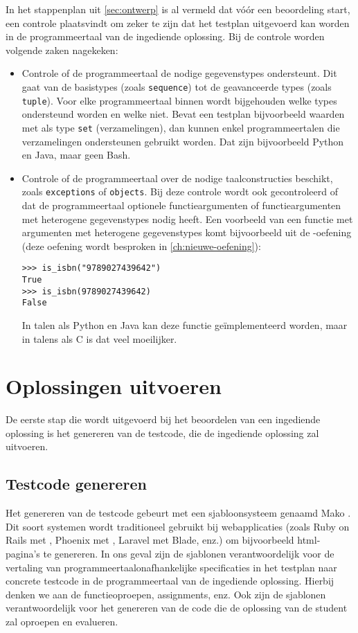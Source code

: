 In het stappenplan uit \cref{sec:ontwerp} is al vermeld dat vóór een beoordeling start, een controle plaatsvindt om zeker te zijn dat het testplan uitgevoerd kan worden in de programmeertaal van de ingediende oplossing.
Bij de controle worden volgende zaken nagekeken:
\begin{itemize}
    \item Controle of de programmeertaal de nodige gegevenstypes ondersteunt.
    Dit gaat van de basistypes (zoals \texttt{sequence}) tot de geavanceerde types (zoals \texttt{tuple}).
    Voor elke programmeertaal binnen \tested{} wordt bijgehouden welke types ondersteund worden en welke niet.
    Bevat een testplan bijvoorbeeld waarden met als type \texttt{set} (verzamelingen), dan kunnen enkel programmeertalen die verzamelingen ondersteunen gebruikt worden.
    Dat zijn bijvoorbeeld Python en Java, maar geen Bash.
    \item Controle of de programmeertaal over de nodige taalconstructies beschikt, zoals \texttt{exceptions} of \texttt{objects}.
    Bij deze controle wordt ook gecontroleerd of dat de programmeertaal optionele functieargumenten of functieargumenten met heterogene gegevenstypes nodig heeft.
    Een voorbeeld van een functie met argumenten met heterogene gegevenstypes komt bijvoorbeeld uit de -oefening (deze oefening wordt besproken in \cref{ch:nieuwe-oefening}):
    \begin{verbatim}
>>> is_isbn("9789027439642")
True
>>> is_isbn(9789027439642)
False
    \end{verbatim}
    In talen als Python en Java kan deze functie geïmplementeerd worden, maar in talens als C is dat veel moeilijker.
\end{itemize}

\section{Oplossingen uitvoeren}\label{sec:oplossingen-uitvoeren}

De eerste stap die wordt uitgevoerd bij het beoordelen van een ingediende oplossing is het genereren van de testcode, die de ingediende oplossing zal uitvoeren.

\subsection{Testcode genereren}\label{subsec:testcode-genereren}

Het genereren van de testcode gebeurt met een sjabloonsysteem genaamd Mako \autocite{mako}.
Dit soort systemen wordt traditioneel gebruikt bij webapplicaties (zoals Ruby on Rails met , Phoenix met , Laravel met Blade, enz.) om bijvoorbeeld html-pagina's te genereren.
In ons geval zijn de sjablonen verantwoordelijk voor de vertaling van programmeertaalonafhankelijke specificaties in het testplan naar concrete testcode in de programmeertaal van de ingediende oplossing.
Hierbij denken we aan de functieoproepen, assignments, enz.
Ook zijn de sjablonen verantwoordelijk voor het genereren van de code die de oplossing van de student zal oproepen en evalueren.

